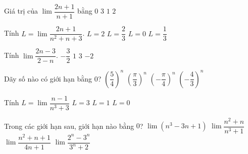 \begin{ex}%
	 Giá trị của $\lim\dfrac{2n+1}{n+1}$ bằng
	 \choice
		{$0$} 
		{$3$} 
		 {$1$}
		 {\True $2$}
\end{ex}

\begin{ex}%
	Tính $L = \lim \dfrac{2n+1}{n^2 +  n + 3}$.
	\choice 
		{$L = 2$} 
		 {$L = \dfrac{2}{3}$}
		{\True $L  = 0$}
		{$L  = \dfrac{1}{3}$}
\end{ex}

\begin{ex}%
	 Tính $\lim \dfrac{2n-3}{2-n}$.
	\choice 
		 {$-\dfrac{3}{2}$}
		{$1$} 
		{$3$} 
		 {\True $-2$}
\end{ex}

\begin{ex}%
	Dãy  số nào có giới hạn bằng $0$?
	 \choice
		{$\left(\dfrac{5}{4}\right)^n$} 
		 {$\left(\dfrac{\pi}{3}\right)^n$}
		{\True  $\left(-\dfrac{\pi}{4}\right)^n$}
		{$\left(-\dfrac{4}{3}\right)^n$} 
\end{ex}

\begin{ex}%
	Tính $L=\displaystyle \lim  \dfrac{n-1}{n^3 +3}$
		{$L=3  $}
		{$L= 1 $} 
		{\True  $L= 0 $}
\end{ex}

\begin{ex}%
	Trong các giới hạn sau, giới hạn nào bằng  $0$?
	 \choice
		{$ \lim(n^3-3n+1)  $}
		{\True $  \lim\dfrac{n^2+n}{n^3+1} $}
		{$  \lim\dfrac{n^2+n+1}{4n+1} $}
		{$ \lim\dfrac{2^n-3^n}{3^n+2} $} 
\end{ex}

